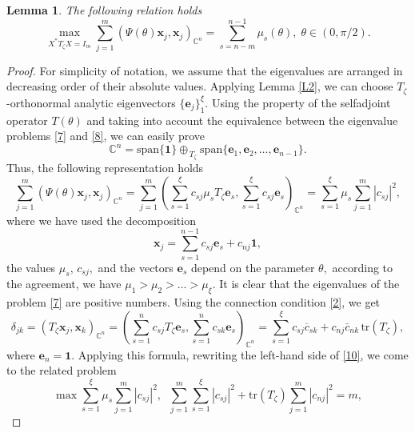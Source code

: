 \documentclass[a4paper,twoside,12pt]{article}
\newtheorem{lemma}{Lemma}
\begin{document}
\begin{lemma}\label{L3} The following relation holds
\begin{equation}\label{10}
 \max\limits_{X^{\ast}T_{\zeta}X= I_{m}} \sum\limits_{j=1}^{m}(\Psi(\theta)\mathbf{x}_{j},\mathbf{x}_{j})_{\mathbb{C}^{n}}=\sum\limits_{s=n-m }^{n-1}\mu_{s}(\theta),\;\theta\in (0,\pi/2).
\end{equation}
\end{lemma}
\begin{proof} For simplicity of notation,  we assume that the eigenvalues  are arranged  in decreasing order of their absolute values.
 Applying Lemma \ref{L2}, we can choose  $T_{\zeta}$-orthonormal analytic eigenvectors $\{\mathbf{e}_{j}\}^{\xi}_{1}.$
Using the property of the selfadjoint operator $T(\theta)$ and taking into account the equivalence between the eigenvalue problems \eqref{7} and  \eqref{8}, we can easily prove
$$
\mathbb{C}^{n}=\mathrm{span}\{\mathbf{1}\}\oplus_{\,T_{\zeta}}\mathrm{span}\{\mathbf{e}_{1},\mathbf{e}_{2},\ldots,\mathbf{e}_{n-1}\}.
$$
Thus,  the following representation holds
$$
 \sum\limits_{j=1}^{m}( \Psi(\theta) \mathbf{x} _{j}  ,     \mathbf{x} _{j}   )_{\mathbb{C}^{n}}=  \sum\limits_{j=1}^{m}\left( \sum\limits_{s=1}^{\xi}c_{sj } \mu_{s}
          T_{\zeta}\mathbf{e}_{s},\sum\limits_{s=1}^{\xi} c_{sj } \mathbf{e}_{s} \right)_{\! \mathbb{C}^{n}}=
          \sum\limits_{s=1}^{\xi}\mu_{s} \sum\limits_{j=1}^{m}  |c_{sj }|^{2},
$$
where we have used the decomposition
$$
\mathbf{x} _{j}= \sum\limits_{s=1}^{n-1} c_{sj }\mathbf{e}_{s}+c_{nj} \mathbf{1},
$$
the values $\mu_{s},\,c_{sj },$ and the vectors $\mathbf{e}_{s}$ depend on the parameter $\theta,$ according to the   agreement, we have $\mu_{1}>\mu_{2}>...>\mu_{\xi}.$ It is clear that the eigenvalues of the problem  \eqref{7} are positive numbers. Using the connection condition \eqref{2}, we get
\begin{equation*}
 \delta_{jk}=(  T_{\zeta} \mathbf{x} _{j} ,\mathbf{x} _{k}   )_{\mathbb{C}^{n}}=
 \left(\sum\limits_{s=1}^{n}c_{sj }T_{\zeta}\mathbf{e}_{s},\sum\limits_{s=1}^{n} c_{sk }\mathbf{e}_{s} \right)_{\!\!\!\mathbb{C}^{n}}=
 \sum\limits_{s=1}^{\xi} c _{sj }\overline{c} _{sk }+c_{nj} \bar{c}_{nk}\,\mathrm{tr}(T_{\zeta}),
\end{equation*}
where $\mathbf{e}_{n}=\mathbf{1}.$
Applying this formula, rewriting the left-hand side of \eqref{10}, we come to the related  problem
$$
\max\limits \sum\limits_{s=1}^{\xi}\mu _{s} \sum\limits_{j=1}^{m}  |c_{sj }|^{2},
\;\;\sum\limits_{j=1}^{m}\sum\limits_{s=1}^{\xi} |c _{sj }|^{2}+\mathrm{tr}(T_{\zeta})\sum\limits_{j=1}^{m}|c _{nj }|^{2}=m,
$$
\end{proof}
\end{document}
